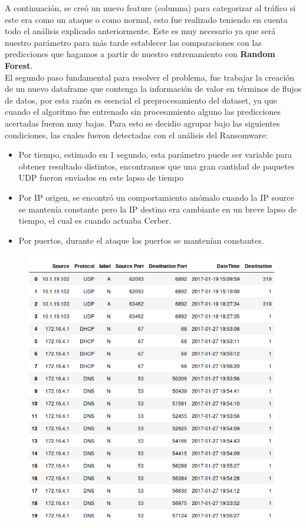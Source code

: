 \documentclass[a4paper,10pt]{article}
\begin{document}
A continuación, se creó un nuevo feature (columna) para categorizar al tráfico si este era como un ataque o como normal, esto fue realizado teniendo en cuenta todo el análisis explicado anteriormente. Este es muy necesario ya que será nuestro parámetro para más tarde establecer las comparaciones con las predicciones que hagamos a partir de nuestro entrenamiento con \textbf{Random Forest}.\\

\medskip
El segundo paso fundamental para resolver el problema, fue trabajar la creación de un nuevo dataframe que contenga la información de valor en términos de flujos de datos, por esta razón es esencial el preprocesamiento del dataset, ya que cuando el algoritmo fue entrenado sin procesamiento alguno las predicciones acertadas fueron muy bajas. Para esto se decidio agrupar bajo las siguientes condiciones, las cuales fueron detectadas con el análisis del Ransomware:
\begin{itemize}
\item Por tiempo, estimado en 1 segundo, esta parámetro puede ser variable para obtener resultado distintos, encontramos que una gran cantidad de paquetes UDP fueron enviados en este lapso de tiempo 
\item Por IP origen, se encontró un comportamiento anómalo cuando la IP source se mantenía constante pero la IP destino era cambiante en un breve lapso de tiempo, el cual es cuando actuaba Cerber.
\item Por puertos, durante el ataque los puertos se mantenían constantes.
\end{itemize}

\begin{figure}[!htp]
\centering
\includegraphics[scale=0.5]{Wireshark/magicmike.png} 
\caption{}
\end{figure}
\end{document}

